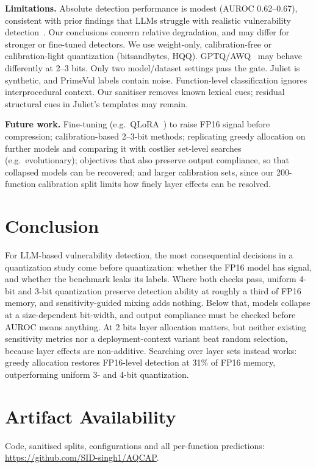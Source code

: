 \documentclass[conference]{IEEEtran}
\begin{document}
\textbf{Limitations.} Absolute detection performance is modest (AUROC 0.62--0.67), consistent with prior findings that LLMs struggle with realistic vulnerability detection~\cite{ding2024primevul,ullah2024secllmholmes}. Our conclusions concern relative degradation, and may differ for stronger or fine-tuned detectors. We use weight-only, calibration-free or calibration-light quantization (bitsandbytes, HQQ). GPTQ/AWQ~\cite{frantar2023gptq,lin2024awq} may behave differently at 2--3 bits. Only two model/dataset settings pass the gate. Juliet is synthetic, and PrimeVul labels contain noise. Function-level classification ignores interprocedural context. Our sanitiser removes known lexical cues; residual structural cues in Juliet's templates may remain.

\textbf{Future work.} Fine-tuning (e.g.\ QLoRA~\cite{dettmers2023qlora}) to raise FP16 signal before compression; calibration-based 2--3-bit methods; replicating greedy allocation on further models and comparing it with costlier set-level searches (e.g.\ evolutionary); objectives that also preserve output compliance, so that collapsed models can be recovered; and larger calibration sets, since our 200-function calibration split limits how finely layer effects can be resolved.

\section{Conclusion}
For LLM-based vulnerability detection, the most consequential decisions in a quantization study come before quantization: whether the FP16 model has signal, and whether the benchmark leaks its labels. Where both checks pass, uniform 4-bit and 3-bit quantization preserve detection ability at roughly a third of FP16 memory, and sensitivity-guided mixing adds nothing. Below that, models collapse at a size-dependent bit-width, and output compliance must be checked before AUROC means anything. At 2 bits layer allocation matters, but neither existing sensitivity metrics nor a deployment-context variant beat random selection, because layer effects are non-additive. Searching over layer sets instead works: greedy allocation restores FP16-level detection at 31\% of FP16 memory, outperforming uniform 3- and 4-bit quantization.

\section*{Artifact Availability}
Code, sanitised splits, configurations and all per-function predictions: \url{https://github.com/SID-singh1/AQCAP}.



\end{document}
